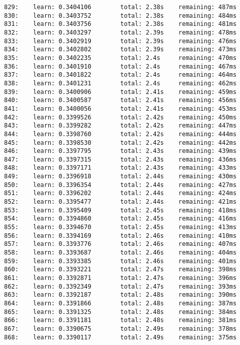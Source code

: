 \documentclass[11pt]{article}
\begin{document}
\begin{Verbatim}[commandchars=\\\{\}]
829:    learn: 0.3404106        total: 2.38s    remaining: 487ms
830:    learn: 0.3403752        total: 2.38s    remaining: 484ms
831:    learn: 0.3403756        total: 2.38s    remaining: 481ms
832:    learn: 0.3403297        total: 2.39s    remaining: 478ms
833:    learn: 0.3402919        total: 2.39s    remaining: 476ms
834:    learn: 0.3402802        total: 2.39s    remaining: 473ms
835:    learn: 0.3402235        total: 2.4s     remaining: 470ms
836:    learn: 0.3401910        total: 2.4s     remaining: 467ms
837:    learn: 0.3401822        total: 2.4s     remaining: 464ms
838:    learn: 0.3401231        total: 2.4s     remaining: 462ms
839:    learn: 0.3400906        total: 2.41s    remaining: 459ms
840:    learn: 0.3400587        total: 2.41s    remaining: 456ms
841:    learn: 0.3400056        total: 2.41s    remaining: 453ms
842:    learn: 0.3399526        total: 2.42s    remaining: 450ms
843:    learn: 0.3399282        total: 2.42s    remaining: 447ms
844:    learn: 0.3398760        total: 2.42s    remaining: 444ms
845:    learn: 0.3398530        total: 2.42s    remaining: 442ms
846:    learn: 0.3397795        total: 2.43s    remaining: 439ms
847:    learn: 0.3397315        total: 2.43s    remaining: 436ms
848:    learn: 0.3397171        total: 2.43s    remaining: 433ms
849:    learn: 0.3396918        total: 2.44s    remaining: 430ms
850:    learn: 0.3396354        total: 2.44s    remaining: 427ms
851:    learn: 0.3396202        total: 2.44s    remaining: 424ms
852:    learn: 0.3395477        total: 2.44s    remaining: 421ms
853:    learn: 0.3395409        total: 2.45s    remaining: 418ms
854:    learn: 0.3394860        total: 2.45s    remaining: 416ms
855:    learn: 0.3394670        total: 2.45s    remaining: 413ms
856:    learn: 0.3394169        total: 2.46s    remaining: 410ms
857:    learn: 0.3393776        total: 2.46s    remaining: 407ms
858:    learn: 0.3393687        total: 2.46s    remaining: 404ms
859:    learn: 0.3393385        total: 2.46s    remaining: 401ms
860:    learn: 0.3393221        total: 2.47s    remaining: 398ms
861:    learn: 0.3392871        total: 2.47s    remaining: 396ms
862:    learn: 0.3392349        total: 2.47s    remaining: 393ms
863:    learn: 0.3392187        total: 2.48s    remaining: 390ms
864:    learn: 0.3391866        total: 2.48s    remaining: 387ms
865:    learn: 0.3391325        total: 2.48s    remaining: 384ms
866:    learn: 0.3391181        total: 2.48s    remaining: 381ms
867:    learn: 0.3390675        total: 2.49s    remaining: 378ms
868:    learn: 0.3390117        total: 2.49s    remaining: 375ms

\end{Verbatim}
\end{document}
